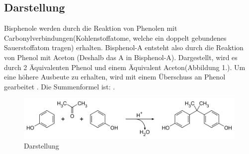 \subsection{Darstellung}
Bisphenole werden durch die Reaktion von Phenolen mit Carbonylverbindungen(Kohlenstoffatome, welche ein doppelt gebundenes Sauerstoffatom tragen) erhalten. Bisphenol-A entsteht also durch die Reaktion von Phenol mit Aceton (Deshalb das \glqq A\grqq{} in Bisphenol-A). Dargestellt, wird es durch 2 Äquivalenten Phenol und einem Äquivalent Aceton(Abbildung 1.). Um eine höhere Ausbeute zu erhalten, wird mit einem Überschuss an Phenol gearbeitet \cite{Herstellung}. Die Summenformel ist: .\\
\begin{figure}[htpb]
    \centering
    \includegraphics[width=.75\textwidth]{Darstellung.png}
    \caption{Darstellung \cite{Wikipedia}}
\end{figure}
\newpage
